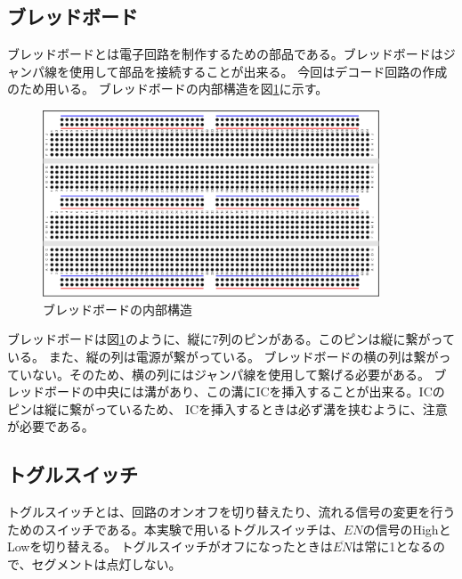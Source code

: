 \documentclass[a4paper,11pt,dvipdfmx]{jsarticle}
\begin{document}
\subsection{ブレッドボード}
ブレッドボードとは電子回路を制作するための部品である。ブレッドボードはジャンパ線を使用して部品を接続することが出来る。
今回はデコード回路の作成のため用いる。
ブレッドボードの内部構造を図\ref{fig:breadboard}に示す。\\
\begin{figure}[H]
  \centering
  \includegraphics[width=10cm]{./images/breadboard.drawio.png}
  \caption{ブレッドボードの内部構造}
  \label{fig:breadboard}
\end{figure}
ブレッドボードは図\ref{fig:breadboard}のように、縦に7列のピンがある。このピンは縦に繋がっている。
また、縦の列は電源が繋がっている。
ブレッドボードの横の列は繋がっていない。そのため、横の列にはジャンパ線を使用して繋げる必要がある。
ブレッドボードの中央には溝があり、この溝にICを挿入することが出来る。ICのピンは縦に繋がっているため、
ICを挿入するときは必ず溝を挟むように、注意が必要である。

\subsection{トグルスイッチ}
トグルスイッチとは、回路のオンオフを切り替えたり、流れる信号の変更を行うためのスイッチである。本実験で用いるトグルスイッチは、$EN$の信号のHighとLowを切り替える。
トグルスイッチがオフになったときは$\overline{EN}$は常に1となるので、セグメントは点灯しない。
\end{document}
